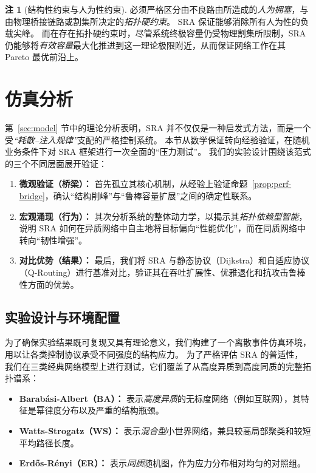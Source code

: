 \documentclass[journal]{IEEEtran}
\theoremstyle{plain}
\theoremstyle{definition}
\newtheorem{remark}{注}
\begin{document}
\begin{remark}[结构性约束与人为性约束]
必须严格区分由不良路由所造成的\textit{人为拥塞}，与由物理桥接链路或割集所决定的\textit{拓扑硬约束}。
SRA 保证能够消除所有人为性的负载尖峰。
而在存在拓扑硬约束时，尽管系统终极容量仍受物理割集所限制，SRA 仍能够将\textit{有效容量}最大化推进到这一理论极限附近，从而保证网络工作在其 Pareto 最优前沿上。
\end{remark}

\section{仿真分析}
\label{sec:simulation}

第~\ref{sec:model} 节中的理论分析表明，SRA 并不仅仅是一种启发式方法，而是一个受\textit{“耗散--注入规律”}支配的严格控制系统。
本节从数学保证转向经验验证，在随机业务条件下对 SRA 框架进行一次全面的“压力测试”。
我们的实验设计围绕该范式的三个不同层面展开验证：
\begin{enumerate}
    \item \textbf{微观验证（桥梁）：} 首先孤立其核心机制，从经验上验证命题~\ref{prop:perf-bridge}，确认“结构削峰”与“鲁棒容量扩展”之间的确定性联系。
    \item \textbf{宏观涌现（行为）：} 其次分析系统的整体动力学，以揭示其\textit{拓扑依赖型智能}，说明 SRA 如何在异质网络中自主地将目标偏向“性能优化”，而在同质网络中转向“韧性增强”。
    \item \textbf{对比优势（结果）：} 最后，我们将 SRA 与静态协议（Dijkstra）和自适应协议（Q-Routing）进行基准对比，验证其在吞吐扩展性、优雅退化和抗攻击鲁棒性方面的优势。
\end{enumerate}

\subsection{实验设计与环境配置}
\label{subsec:sim_setup}

为了确保实验结果既可复现又具有理论意义，我们构建了一个离散事件仿真环境，用以让各类控制协议承受不同强度的结构应力。
为了严格评估 SRA 的普适性，我们在三类经典网络模型上进行测试，它们覆盖了从高度异质到高度同质的完整拓扑谱系：
\begin{itemize}
    \item \textbf{Barabási-Albert（BA）：} 表示\textit{高度异质}的无标度网络（例如互联网），其特征是幂律度分布以及严重的结构瓶颈。
    \item \textbf{Watts-Strogatz（WS）：} 表示\textit{混合型}小世界网络，兼具较高局部聚类和较短平均路径长度。
    \item \textbf{Erd\H{o}s-Rényi（ER）：} 表示\textit{同质}随机图，作为应力分布相对均匀的对照组。
\end{itemize}
\end{document}
